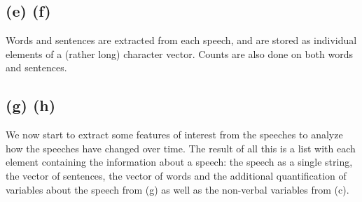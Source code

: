 \documentclass{article}
\begin{document}
\subsection*{(e) (f)}

Words and sentences are extracted from each speech, and are stored as individual elements of a (rather long)
character vector. Counts are also done on both words and sentences.

\newpage



\subsection*{(g) (h)}

We now start to extract some features of interest from the speeches to analyze how the speeches have
changed over time. The result of all this is a list with each element containing the information
about a speech: the speech as a single string, the vector of sentences, the vector of words
and the additional quantification of variables about the speech from (g) as well as
the non-verbal variables from (c).
\end{document}
